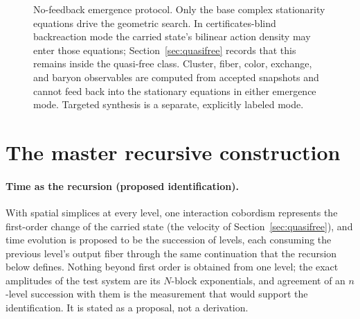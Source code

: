 \documentclass[11pt,letterpaper]{article}
\begin{document}
\begin{figure}[htb]
\caption{No-feedback emergence protocol. Only the base complex stationarity
equations drive the geometric search. In certificates-blind backreaction mode
the carried state's bilinear action density may enter those equations;
Section~\ref{sec:quasifree} records that this remains inside the quasi-free
class. Cluster, fiber, color, exchange, and baryon observables are computed
from accepted snapshots and cannot feed back into the stationary equations in either
emergence mode. Targeted synthesis is a separate, explicitly labeled mode.}
\label{fig:firewall}
\end{figure}

\section{The master recursive construction}\label{sec:master}

\paragraph{Time as the recursion (proposed identification).}
With spatial simplices at every level, one interaction cobordism represents
the first-order change of the carried state (the velocity of
Section~\ref{sec:quasifree}), and time evolution is proposed to be the
succession of levels, each consuming the previous level's output fiber
through the same continuation that the recursion below defines. Nothing
beyond first order is obtained from one level; the exact amplitudes of the
test system are its $N$-block exponentials, and agreement of an $n$-level
succession with them is the measurement that would support the
identification. It is stated as a proposal, not a derivation.
\end{document}
